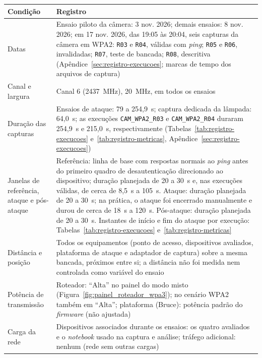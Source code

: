 \begin{quadro}[htbp]
\centering
\caption{Condições de execução dos ensaios}
\label{quad:condicoes}
\marcadoresTabela
\small
\renewcommand{\arraystretch}{1.15}
\begin{tabular}{|>{\raggedright\arraybackslash}p{}|>{\raggedright\arraybackslash}p{}|}
\hline
\textbf{Condição} & \textbf{Registro} \\ \hline
Datas & Ensaio piloto da câmera: 3 nov. 2026; demais ensaios: 8 nov. 2026; em 17 nov. 2026, das 19:05 às 20:04, seis capturas da câmera em WPA2: \texttt{R03} e \texttt{R04}, válidas com \textit{ping}; \texttt{R05} e \texttt{R06}, invalidadas; \texttt{R07}, teste de bancada; \texttt{R08}, descritiva (Apêndice~\ref{sec:registro-execucoes}; marcas de tempo dos arquivos de captura) \\ \hline
Canal e largura & Canal 6 (2437~MHz), 20~MHz, em todos os ensaios \\ \hline
Duração das capturas & Ensaios de ataque: 79 a 254,9~s; captura dedicada da lâmpada: 64,0~s; as execuções \texttt{CAM\_WPA2\_R03} e \texttt{CAM\_WPA2\_R04} duraram 254,9~s e 215,0~s, respectivamente (Tabelas~\ref{tab:registro-execucoes} e~\ref{tab:registro-metricas}, Apêndice~\ref{sec:registro-execucoes}) \\ \hline
Janelas de referência, ataque e pós-ataque & Referência: linha de base com respostas normais ao \textit{ping} antes do primeiro quadro de desautenticação direcionado ao dispositivo; duração planejada de 20 a 30~s e, nas execuções válidas, de cerca de 8,5~s a 105~s. Ataque: duração planejada de 20 a 30~s; na prática, o ataque foi encerrado manualmente e durou de cerca de 18~s a 120~s. Pós-ataque: duração planejada de 20 a 30~s. Instantes de início e fim do ataque por execução: Tabelas~\ref{tab:registro-execucoes} e~\ref{tab:registro-metricas} \\ \hline
Distância e posição & Todos os equipamentos (ponto de acesso, dispositivos avaliados, plataforma de ataque e adaptador de captura) sobre a mesma bancada, próximos entre si; a distância não foi medida nem controlada como variável do ensaio \\ \hline
Potência de transmissão & Roteador: ``Alta'' no painel do modo misto (Figura~\ref{fig:painel_roteador_wpa3}); no cenário WPA2 também em ``Alta''; plataforma (Bruce): potência padrão do \textit{firmware} (não ajustada) \\ \hline
Carga da rede & Dispositivos associados durante os ensaios: os quatro avaliados e o \textit{notebook} usado na captura e análise; tráfego adicional: nenhum (rede sem outras cargas) \\ \hline

\end{tabular}
\end{quadro}
